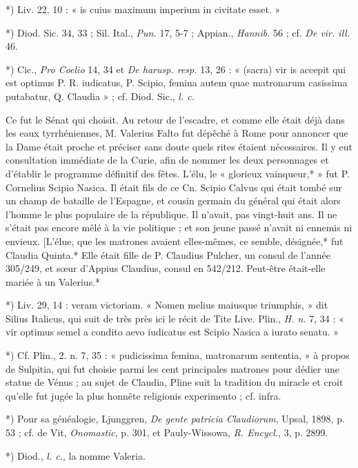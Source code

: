 \documentclass[a4paper, 11pt, oneside, polutonikogreek, french]{article}
\begin{document}
*) Liv. 22, 10 : « is cuius maximum imperium in civitate esset. »

*) Diod. Sic. 34, 33 ; Sil. Ital., \emph{Pun.} 17, 5-7 ; Appian., \emph{Hannib.} 56 ; cf. \emph{De vir. ill.} 46.

*) Cic., \emph{Pro Coelio} 14, 34 et \emph{De harusp. resp.} 13, 26 : « (sacra) vir is accepit qui est optimus P. R. iudicatus, P. Scipio, femina autem quae matronarum casissima putabatur, Q. Claudia » ; cf. Diod. Sic., \emph{l. c.}

Ce fut le Sénat qui choisit. Au retour de l'escadre, et comme elle était déjà dans les eaux tyrrhéniennes, M. Valerius Falto fut dépêché à Rome pour annoncer que la Dame était proche et préciser sans doute quels rites étaient nécessaires. Il y eut consultation immédiate de la Curie, afin de nommer les deux personnages et d'établir le programme définitif des fêtes. L'élu, le « glorieux vainqueur,* » fut P. Cornelius Scipio Nasica. Il était fils de ce Cn. Scipio Calvus qui était tombé sur un champ de bataille de l'Espagne, et cousin germain du général qui était alors l'homme le plus populaire de la république. Il n'avait, pas vingt-huit ans. Il ne s'était pas encore mêlé à la vie politique ; et son jeune passé n'avait ni ennemis ni envieux. [L'élue, que les matrones avaient elles-mêmes, ce semble, désignée,* fut Claudia Quinta.* Elle était fille de P. Claudius Pulcher, un consul de l'année 305/249, et sœur d'Appius Claudius, consul en 542/212. Peut-être était-elle mariée à un Valerius.*

*) Liv.  29, 14 : veram victoriam. « Nomen melius maiusque triumphis, » dit Silius Italicus, qui suit de très près ici le récit de Tite Live. Plin., \emph{H. n.} 7, 34 : « vir optimus semel a condito aevo iudicatus est Scipio Nasica a iurato senatu. »

*) Cf. Plin., 2. n. 7, 35 : « pudicissima femina, matronarum sententia, » à propos de Sulpitia, qui fut choisie parmi les cent principales matrones pour dédier une statue de Vénus ; au sujet de Claudia, Pline suit la tradition du miracle et croit qu'elle fut jugée la plus honnête religionis experimento ; cf. infra.

*) Pour sa généalogie, Ljunggren, \emph{De gente patricia Claudiorum}, Upsal, 1898, p. 53 ; cf. de Vit, \emph{Onomastic}, p. 301, et Pauly-Wissowa, \emph{R. Encycl.}, 3, p. 2899.

*) Diod., \emph{l. c.}, la nomme Valeria.
\end{document}
